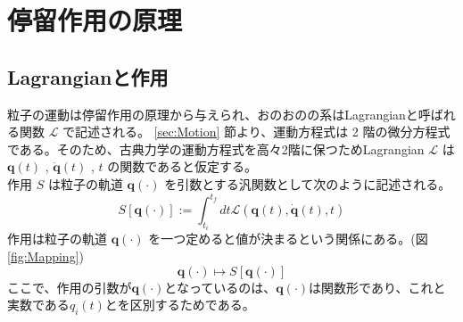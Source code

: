 \documentclass[a4paper,11pt]{ltjsarticle}
\newcommand{\qv}{\bm{q}}
\newcommand{\La}{\mathcal{L}}
\newcommand{\Laq}{\mathcal{L}(\qv(t),\dot{\qv}(t),t)}
\begin{document}
\section{停留作用の原理}

\subsection{Lagrangianと作用}
粒子の運動は停留作用の原理から与えられ、おのおのの系はLagrangianと呼ばれる関数 $\La$ で記述される。
\ref{sec:Motion} 節より、運動方程式は 2 階の微分方程式である。そのため、古典力学の運動方程式を高々2階に保つためLagrangian $\La$ は
$\qv(t)$ , $\dot{\qv}(t)$ , $t$ の関数であると仮定する。
\\作用 $S$ は粒子の軌道 $\qv(\cdot)$ を引数とする汎関数として次のように記述される。
\[
S[\qv(\cdot)]:=\int_{t_i}^{t_f}dt\Laq
\]
作用は粒子の軌道 $\qv(\cdot)$ を一つ定めると値が決まるという関係にある。(図\ref{fig:Mapping})
\[
\qv(\cdot) \longmapsto S[\qv(\cdot)]
\]
ここで、作用の引数が$\bm{q}(\cdot)$となっているのは、$\bm{q}(\cdot)$は関数形であり、これと実数である$q_i(t)$とを区別するためである。
\end{document}
